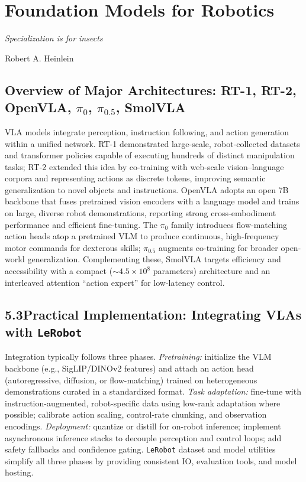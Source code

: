 \section{Foundation Models for Robotics}
\label{sec:learning-bc-generalist}

\epigraph{\textit{Specialization is for insects}}{Robert A. Heinlein}

\subsection{Overview of Major Architectures: RT-1, RT-2, OpenVLA, $\pi_0$, $\pi_{0.5}$, SmolVLA}
VLA models integrate perception, instruction following, and action generation within a unified network. RT-1 demonstrated large-scale, robot-collected datasets and transformer policies capable of executing hundreds of distinct manipulation tasks; RT-2 extended this idea by co-training with web-scale vision–language corpora and representing actions as discrete tokens, improving semantic generalization to novel objects and instructions. OpenVLA adopts an open 7B backbone that fuses pretrained vision encoders with a language model and trains on large, diverse robot demonstrations, reporting strong cross-embodiment performance and efficient fine-tuning. The $\pi_0$ family introduces flow-matching action heads atop a pretrained VLM to produce continuous, high-frequency motor commands for dexterous skills; $\pi_{0.5}$ augments co-training for broader open-world generalization. Complementing these, SmolVLA targets efficiency and accessibility with a compact (\(\sim\!4.5\times10^8\) parameters) architecture and an interleaved attention ``action expert'' for low-latency control.

\subsection*{5.3\quad Practical Implementation: Integrating VLAs with \texttt{LeRobot}}
Integration typically follows three phases. \emph{Pretraining:} initialize the VLM backbone (e.g., SigLIP/DINOv2 features) and attach an action head (autoregressive, diffusion, or flow-matching) trained on heterogeneous demonstrations curated in a standardized format. \emph{Task adaptation:} fine-tune with instruction-augmented, robot-specific data using low-rank adaptation where possible; calibrate action scaling, control-rate chunking, and observation encodings. \emph{Deployment:} quantize or distill for on-robot inference; implement asynchronous inference stacks to decouple perception and control loops; add safety fallbacks and confidence gating. \texttt{LeRobot} dataset and model utilities simplify all three phases by providing consistent IO, evaluation tools, and model hosting.

